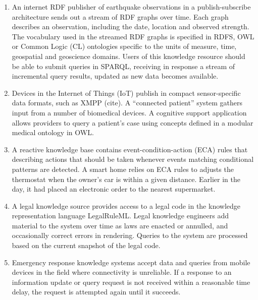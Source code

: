 \documentclass[runningheads]{llncs}
\begin{document}
\begin{enumerate}
\item %
An internet RDF publisher of earthquake observations in a publish-subscribe architecture sends out a stream of RDF graphs over time. Each graph describes an observation, including the date, location and observed strength. The vocabulary used in the streamed RDF graphs is specified in RDFS, OWL or Common Logic (CL) ontologies specific to the units of measure, time, geospatial and geoscience domains. Users of this knowledge resource should be able to submit queries in SPARQL, receiving in response a stream of incremental query results, updated as new data becomes available.
\item %
Devices in the Internet of Things (IoT) publish in compact sensor-specific data formats, such as XMPP (cite).  A ``connected patient'' system gathers input from a number of biomedical devices. A cognitive support application allows providers to query a patient's case using concepts defined in a modular medical ontology in OWL.
\item %
A reactive knowledge base contains event-condition-action (ECA) rules that describing actions that should be taken whenever events matching conditional patterns are detected. A smart home relies on ECA rules to adjusts the thermostat when the owner's car is within a given distance. Earlier in the day, it had placed an electronic order to the nearest supermarket.
\item %
A legal knowledge source provides access to a legal code in the knowledge representation language LegalRuleML. Legal knowledge engineers add material to the system over time as laws are enacted or annulled, and occasionally correct errors in rendering. Queries to the system are processed based on the current snapshot of the legal code.
\item %
Emergency response knowledge systems accept data and queries from mobile devices in the field where connectivity is unreliable. If a response to an information update or query request is not received within a reasonable time delay, the request is attempted again until it succeeds.
\end{enumerate}
\end{document}
